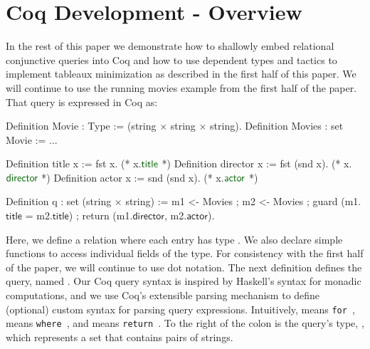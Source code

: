 \documentclass[preprint]{sigplanconf}
\newcommand{\FOR}{{\tt for}\relax\ifmmode\ \else\xspace\fi}
\newcommand{\WHERE}{{\tt where}\relax\ifmmode\ \else\xspace\fi}
\newcommand{\RETURN}{{\tt return}\relax\ifmmode\ \else\xspace\fi}
\begin{document}
\section{Coq Development - Overview}

In the rest of this paper we demonstrate how to shallowly embed relational conjunctive queries into Coq and how to use dependent types and tactics to implement tableaux minimization as described in the first half of this paper.  We will continue to use the running movies example from the first half of the paper.  That query is expressed in Coq as:
\begin{coq}
Definition Movie : Type := (string $\times$ string $\times$ string).
Definition Movies : set Movie := ...

Definition title x := fst x. (* x.$\textcolor{dkgreen}{\textsf{title}}$ *)
Definition director x := fst (snd x). (* x.$\textcolor{dkgreen}{\textsf{director}}$ *)
Definition actor x := snd (snd x). (* x.$\textcolor{dkgreen}{\textsf{actor}}$ *)

Definition q : set (string $\times$ string) :=
  m1 <- Movies ; m2 <- Movies ;
  guard (m1.$\textsf{title}$ = m2.$\textsf{title}$) ;
  return (m1.$\textsf{director}$, m2.$\textsf{actor}$).
\end{coq}
Here, we define a relation  where each entry has type .
We also declare simple functions to access individual fields of the  type.
For consistency with the first half of the paper, we will continue to use dot notation.
The next definition defines the query, named .
Our Coq query syntax is inspired by Haskell's syntax for monadic computations, and we use Coq's extensible parsing mechanism to define (optional) custom syntax for parsing query expressions.
Intuitively, \coqe{<-} means \FOR,  means \WHERE, and  means \RETURN.
To the right of the colon is the query's type, , which represents a set that contains pairs of strings.
\end{document}
